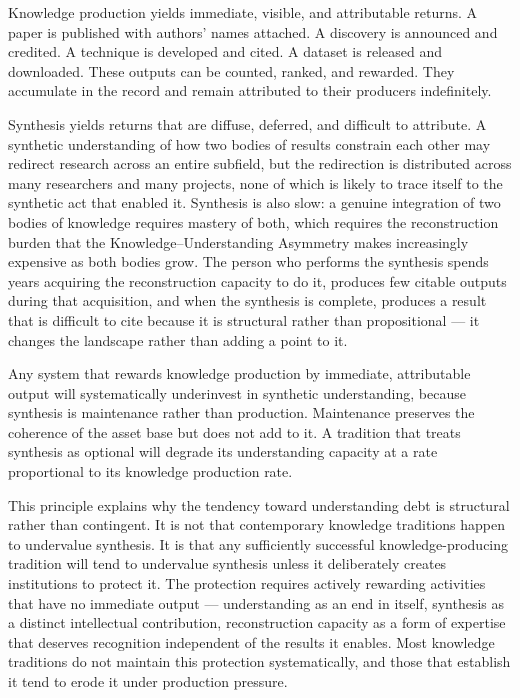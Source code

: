 Knowledge production yields immediate, visible, and attributable returns.
A paper is published with authors' names attached. A discovery is announced
and credited. A technique is developed and cited. A dataset is released and
downloaded. These outputs can be counted, ranked, and rewarded. They accumulate
in the record and remain attributed to their producers indefinitely.

Synthesis yields returns that are diffuse, deferred, and difficult to attribute.
A synthetic understanding of how two bodies of results constrain each other
may redirect research across an entire subfield, but the redirection is
distributed across many researchers and many projects, none of which is likely
to trace itself to the synthetic act that enabled it. Synthesis is also slow:
a genuine integration of two bodies of knowledge requires mastery of both,
which requires the reconstruction burden that the Knowledge--Understanding
Asymmetry makes increasingly expensive as both bodies grow. The person who
performs the synthesis spends years acquiring the reconstruction capacity to
do it, produces few citable outputs during that acquisition, and when the
synthesis is complete, produces a result that is difficult to cite because it
is structural rather than propositional --- it changes the landscape rather
than adding a point to it.

\begin{principle}
Any system that rewards knowledge production by immediate, attributable
output will systematically underinvest in synthetic understanding, because
synthesis is maintenance rather than production. Maintenance preserves the
coherence of the asset base but does not add to it. A tradition that treats
synthesis as optional will degrade its understanding capacity at a rate
proportional to its knowledge production rate.
\end{principle}

This principle explains why the tendency toward understanding debt is structural
rather than contingent. It is not that contemporary knowledge traditions
happen to undervalue synthesis. It is that any sufficiently successful
knowledge-producing tradition will tend to undervalue synthesis unless it
deliberately creates institutions to protect it. The protection requires
actively rewarding activities that have no immediate output --- understanding
as an end in itself, synthesis as a distinct intellectual contribution,
reconstruction capacity as a form of expertise that deserves recognition
independent of the results it enables. Most knowledge traditions do not
maintain this protection systematically, and those that establish it tend
to erode it under production pressure.

